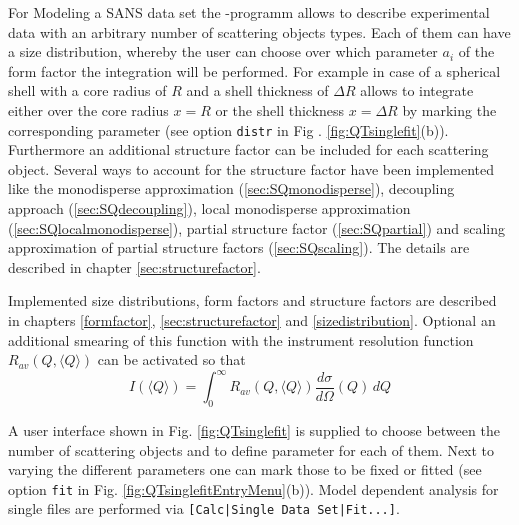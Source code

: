 For Modeling a SANS data set the \SASfit-programm allows to
describe experimental data with an arbitrary number of scattering
objects types. Each of them can have a size distribution, whereby
the user can choose over which parameter $a_i$ of the form factor
the integration will be performed. For example in case of a
spherical shell with a core radius of $R$ and a shell thickness of
$\Delta R$ \SASfit allows to integrate either over the core
radius $x=R$ or the shell thickness $x=\Delta R$ by marking the
corresponding parameter (see option {\tt distr} in Fig .
\ref{fig:QTsinglefit}(b)). Furthermore an additional structure factor
can be included for each scattering object. Several ways to account
for the structure factor have been implemented like the monodisperse
approximation (\ref{sec:SQmonodisperse}), decoupling approach
(\ref{sec:SQdecoupling}), local monodisperse approximation
(\ref{sec:SQlocalmonodisperse}), partial structure factor
(\ref{sec:SQpartial}) and scaling approximation of partial structure
factors (\ref{sec:SQscaling}). The details are described in chapter
\ref{sec:structurefactor}.

Implemented size distributions, form factors and structure factors
are described in chapters \ref{formfactor},
\ref{sec:structurefactor} and \ref{sizedistribution}. Optional an
additional smearing of this function with the instrument resolution
function $R_{av}\left(Q,\langle Q\rangle\right)$ can be activated so
that
\begin{equation}
I(\langle Q\rangle) = \int_0^\infty R_{av}\left(Q,\langle
Q\rangle\right) \frac{d\sigma}{d\Omega}(Q) \, dQ
\end{equation}

A user interface shown in Fig. \ref{fig:QTsinglefit} is supplied to
choose between the number of scattering objects and to define
parameter for each of them. Next to varying the different parameters
one can mark those to be fixed or fitted (see option {\tt fit} in Fig.
\ref{fig:QTsinglefitEntryMenu}(b)). Model dependent analysis for single files
are performed via \verb"[Calc|Single Data Set|Fit...]".

